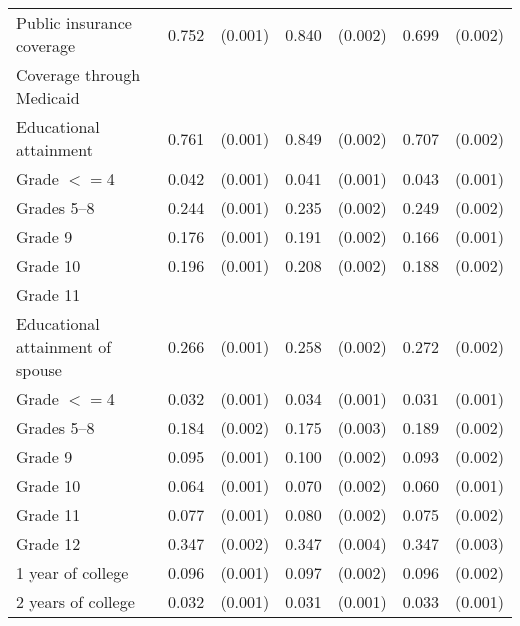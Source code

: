 \begin{tabular}{lcccccc}
 \hspace{0.3cm}  Public insurance coverage   & 0.752 & (0.001)  & 0.840 & (0.002)  & 0.699 & (0.002)  \\
 \hspace{0.3cm}  Coverage through Medicaid   & & &  \\
 Educational attainment   & 0.761 & (0.001)  & 0.849 & (0.002)  & 0.707 & (0.002)  \\
 \hspace{0.3cm} Grade $<=$4   & 0.042 & (0.001)  & 0.041 & (0.001)  & 0.043 & (0.001)  \\
 \hspace{0.3cm}  Grades 5--8   & 0.244 & (0.001)  & 0.235 & (0.002)  & 0.249 & (0.002)  \\
 \hspace{0.3cm} Grade 9   & 0.176 & (0.001)  & 0.191 & (0.002)  & 0.166 & (0.001)  \\
 \hspace{0.3cm} Grade 10   & 0.196 & (0.001)  & 0.208 & (0.002)  & 0.188 & (0.002)  \\
 \hspace{0.3cm} Grade 11   & & &  \\
 Educational attainment of spouse   & 0.266 & (0.001)  & 0.258 & (0.002)  & 0.272 & (0.002)  \\
 \hspace{0.3cm} Grade $<=$4   & 0.032 & (0.001)  & 0.034 & (0.001)  & 0.031 & (0.001)  \\
 \hspace{0.3cm}  Grades 5--8   & 0.184 & (0.002)  & 0.175 & (0.003)  & 0.189 & (0.002)  \\
 \hspace{0.3cm} Grade 9   & 0.095 & (0.001)  & 0.100 & (0.002)  & 0.093 & (0.002)  \\
 \hspace{0.3cm} Grade 10   & 0.064 & (0.001)  & 0.070 & (0.002)  & 0.060 & (0.001)  \\
 \hspace{0.3cm} Grade 11   & 0.077 & (0.001)  & 0.080 & (0.002)  & 0.075 & (0.002)  \\
 \hspace{0.3cm} Grade 12   & 0.347 & (0.002)  & 0.347 & (0.004)  & 0.347 & (0.003)  \\
 \hspace{0.3cm} 1 year of college   & 0.096 & (0.001)  & 0.097 & (0.002)  & 0.096 & (0.002)  \\
 \hspace{0.3cm} 2 years of college   & 0.032 & (0.001)  & 0.031 & (0.001)  & 0.033 & (0.001)  \\

\end{tabular}
